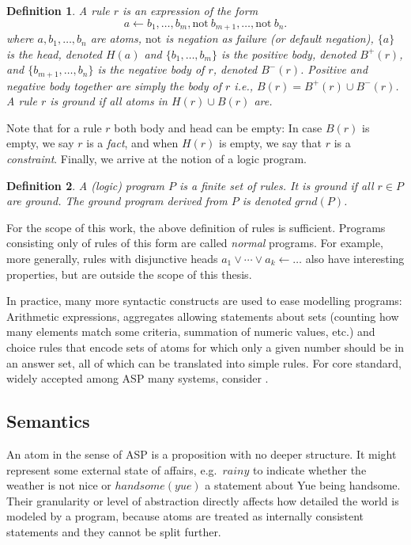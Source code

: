 \documentclass{vutinfth} %
\newtheorem{definition}{Definition}[chapter]
\newcommand{\headf}{H}
\newcommand{\bodyf}{B}
\newcommand{\fail}{\mathrm{not } \ \xspace}
\newcommand{\from}{\ensuremath{\leftarrow}}
\begin{document}
\begin{definition}
A \emph{rule} $r$ is an expression of the form $$a \from b_1, \ldots, b_m, \fail b_{m+1}, \ldots, \fail b_n.$$ where $a, b_1, \ldots, b_n$ are atoms, $\mathrm{not}$ is \emph{negation as failure} (or \emph{default negation}), $\{ a \}$ is the \emph{head}, denoted $\headf(a)$ and $\{ b_1, \ldots, b_m \}$ is the \emph{positive body}, denoted $\bodyf^+(r)$, and $\{ b_{m+1}, \ldots, b_n \}$ is the \emph{negative body} of $r$, denoted $\bodyf^-(r)$. Positive and negative body together are simply the \emph{body} of $r$ i.e., $\bodyf(r) = \bodyf^+(r)\cup \bodyf^-(r)$.
A rule $r$ is \emph{ground} if all atoms in $\headf(r) \cup \bodyf(r)$ are.
\end{definition}

Note that for a rule $r$ both body and head can be empty: In case $\bodyf(r)$ is empty, we say $r$ is a \emph{fact}, and when $\headf(r)$ is empty, we say that $r$ is a \emph{constraint}. Finally, we arrive at the notion of a logic program.

\begin{definition}
A \emph{(logic) program} $P$ is a finite set of rules. It is \emph{ground} if all $r \in P$ are ground. The ground program derived from $P$ is denoted $grnd(P)$.
\end{definition}

For the scope of this work, the above definition of rules is sufficient. Programs consisting only of rules of this form are called \emph{normal} programs. For example, more generally, rules with disjunctive heads $a_1 \vee \cdots \vee a_k \from \ldots$ also have interesting properties, but are outside the scope of this thesis.

In practice, many more syntactic constructs are used to ease modelling programs: Arithmetic expressions, aggregates allowing statements about sets (counting how many elements match some criteria, summation of numeric values, etc.) and choice rules that encode sets of atoms for which only a given number should be in an answer set, all of which can be translated into simple rules. For core standard, widely accepted among ASP many systems, consider \cite{calimeri2015asp}.

\subsection{Semantics}

An atom in the sense of ASP is a proposition with no deeper structure. It might represent some external state of affairs, e.g.~$rainy$ to indicate whether the weather is not nice or $handsome(yue)$ a statement about Yue being handsome. Their granularity or level of abstraction directly affects how detailed the world is modeled by a program, because atoms are treated as internally consistent statements and they cannot be split further.
\end{document}
